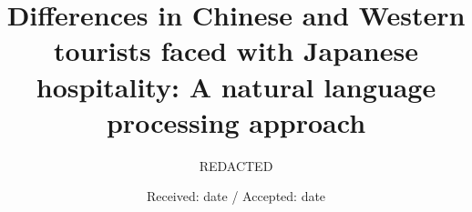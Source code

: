 \documentclass[smallextended,natbib]{svjour3}       %
\providecommand{\DIFdelbegin}{} %
\providecommand{\DIFdelend}{} %
\newcommand{\DIFscaledelfig}{0.5}
\newlength{\DIFdelgraphicswidth} %
\newlength{\DIFdelgraphicsheight} %
\newcommand{\DIFdelincludegraphics}[2][]{%
\sbox{\DIFdelgraphicsbox}{\DIFOincludegraphics[#1]{#2}}%
\settoboxwidth{\DIFdelgraphicswidth}{\DIFdelgraphicsbox} %
\settoboxtotalheight{\DIFdelgraphicsheight}{\DIFdelgraphicsbox} %
\scalebox{\DIFscaledelfig}{%
\parbox[b]{\DIFdelgraphicswidth}{\usebox{\DIFdelgraphicsbox}\\[-\baselineskip] \rule{\DIFdelgraphicswidth}{0em}}\llap{\resizebox{\DIFdelgraphicswidth}{\DIFdelgraphicsheight}{%
\setlength{\unitlength}{\DIFdelgraphicswidth}%
\begin{picture}(1,1)%
\thicklines\linethickness{2pt} %
{\color[rgb]{1,0,0}\put(0,0){\framebox(1,1){}}}%
{\color[rgb]{1,0,0}\put(0,0){\line( 1,1){1}}}%
{\color[rgb]{1,0,0}\put(0,1){\line(1,-1){1}}}%
\end{picture}%
}\hspace*{3pt}}} %
} %
\DeclareRobustCommand{\DIFdelbegin}{\DIFOdelbegin \let\includegraphics\DIFdelincludegraphics} %
\DeclareRobustCommand{\DIFdelend}{\DIFOaddend \let\includegraphics\DIFOincludegraphics} %
\begin{document}
\title{Differences in Chinese and Western tourists faced with Japanese hospitality: A natural language processing approach}
\DIFdelbegin %

\DIFdelend %

        \author{REDACTED}



        \date{Received: date / Accepted: date}

        \maketitle
\end{document}
